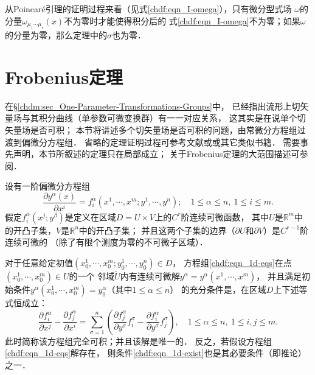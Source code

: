 \begin{remark}\label{chdf:rek_poincare-lemma}
    从Poincar\'{e}引理的证明过程来看（见式\eqref{chdf:eqn_I-omega}），只有微分型式场
    $\omega$的分量$\omega_{\mu_{1}\cdots \mu_{r}}(x)$不为零时才能使得积分后的
    式\eqref{chdf:eqn_I-omega}不为零；如果$\omega$的分量为零，那么定理中的$\sigma$也为零．
\end{remark}










\section{Frobenius定理}\label{chdf:sec_frobenius}

在\S \ref{chdm:sec_One-Parameter-Transformations-Groups}中，
已经指出流形上切矢量场与其积分曲线（单参数可微变换群）有一一对应关系，
这其实是在说单个切矢量场是否可积；
本节将讲述多个切矢量场是否可积的问题，由常微分方程组过渡到偏微分方程组．
省略的定理证明过程可参考文献\parencite[\S 1.4]{cc2001-zh}或\parencite[\S 3.4]{chenwh2001}或其它类似书籍． 
需要事先声明，本节所叙述的定理只在局部成立；
关于Frobenius定理的大范围描述可参阅\parencite[\S 6.6-6.7]{spivak-dif-1}．

设有一阶偏微分方程组
\begin{equation}\label{chdf:eqn_1d-eqs}
    \frac{\partial y^\alpha(x)}{\partial x^i} = f_i^\alpha (x^1,\cdots, x^m;y^1,\cdots,y^n);
    \quad 1 \leqslant \alpha \leqslant n, \ 1 \leqslant i \leqslant m .
\end{equation}
假定$f_i ^\alpha (x^j; y^\beta)$是定义在区域$D=U \times V $上的$C^r$阶连续可微函数，
其中$U$是$\mathbb{R}^m$中的开凸子集，$V$是$\mathbb{R}^n$中的开凸子集；
并且这两个子集的边界（$\partial U$和$\partial  V$）是$C^{r-1}$阶连续可微的
（除了有限个测度为零的不可微子区域）．

\begin{theorem}\label{chdf:thm_1d-exist}
    对于任意给定初值$(x^1_0,\cdots, x^m _0;y^1_0,\cdots,y^n_0)\in D$，
    方程组\eqref{chdf:eqn_1d-eqs}在点$(x^1_0,\cdots, x^m _0)\in U$的一个
    邻域$\tilde{U}$内有连续可微解$y^\alpha=y^\alpha(x^1,\cdots, x^m)$，
    并且满足初始条件$y^\alpha(x^1_0,\cdots, x^m _0)=y^\alpha_0$（其中$ 1 \leqslant \alpha \leqslant n$）
    的充分条件是，在区域$D$上下述等式恒成立：
    \begin{equation}\label{chdf:eqn_1d-exist}
        \frac{\partial f_i^\alpha}{\partial x^j} - \frac{\partial f^\alpha_j}{\partial x^i}
        = \sum_{\sigma=1}^{n} \left(\frac{\partial f^\alpha_j}{\partial y^\sigma} f^\sigma_i
          - \frac{\partial f_i^\alpha}{\partial y^\sigma} f^\sigma_j \right),
        \quad  1 \leqslant \alpha \leqslant n, \ 1 \leqslant i,j \leqslant m.
    \end{equation}
    此时简称该方程组完全可积；并且该解是唯一的．
    反之，若假设方程组\eqref{chdf:eqn_1d-eqs}解存在，
    则条件\eqref{chdf:eqn_1d-exist}也是其必要条件（即推论）之一．
\end{theorem}


